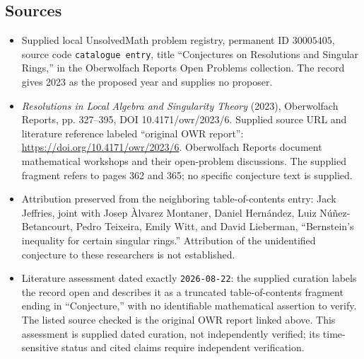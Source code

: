 \documentclass[11pt]{article}
\begin{document}
\subsection{Sources}
\begin{itemize}
\item Supplied local UnsolvedMath problem registry, permanent ID \(30005405\), source code \texttt{catalogue entry}, title ``Conjectures on Resolutions and Singular Rings,'' in the Oberwolfach Reports Open Problems collection. The record gives 2023 as the proposed year and supplies no proposer.
\item \emph{Resolutions in Local Algebra and Singularity Theory} (2023), Oberwolfach Reports, pp. 327--395, DOI 10.4171/owr/2023/6. Supplied source URL and literature reference labeled ``original OWR report'': \url{https://doi.org/10.4171/owr/2023/6}. Oberwolfach Reports document mathematical workshops and their open-problem discussions. The supplied fragment refers to pages 362 and 365; no specific conjecture text is supplied.
\item Attribution preserved from the neighboring table-of-contents entry: Jack Jeffries, joint with Josep Àlvarez Montaner, Daniel Hernández, Luiz Núñez-Betancourt, Pedro Teixeira, Emily Witt, and David Lieberman, ``Bernstein’s inequality for certain singular rings.'' Attribution of the unidentified conjecture to these researchers is not established.
\item Literature assessment dated exactly \texttt{2026-08-22}: the supplied curation labels the record open and describes it as a truncated table-of-contents fragment ending in ``Conjecture,'' with no identifiable mathematical assertion to verify. The listed source checked is the original OWR report linked above. This assessment is supplied dated curation, not independently verified; its time-sensitive status and cited claims require independent verification.
\end{itemize}
\end{document}
